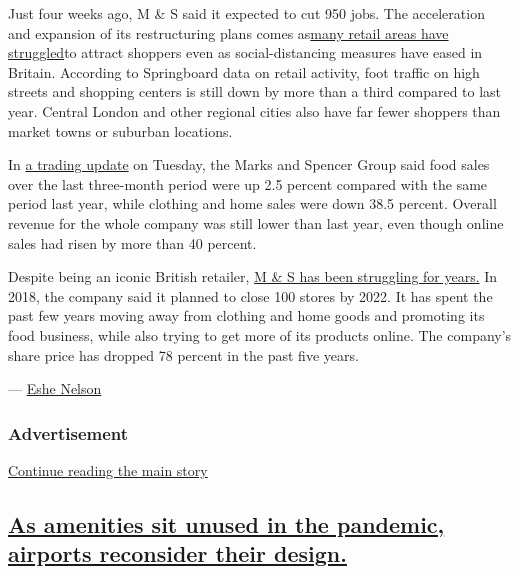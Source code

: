 Just four weeks ago, M \& S said it expected to cut 950 jobs. The
acceleration and expansion of its restructuring plans comes
as\href{https://www.nytimes3xbfgragh.onion/2020/07/31/business/britain-economic-comeback-suburbs.html}{many
retail areas have struggled}to attract shoppers even as
social-distancing measures have eased in Britain. According to
Springboard data on retail activity, foot traffic on high streets and
shopping centers is still down by more than a third compared to last
year. Central London and other regional cities also have far fewer
shoppers than market towns or suburban locations.

In
\href{https://corporate.marksandspencer.com/media/press-releases/5e0f046f7880b21924350282/marks-and-spencer-group-plc-trading-update-and-streamlining-announcement}{a
trading update} on Tuesday, the Marks and Spencer Group said food sales
over the last three-month period were up 2.5 percent compared with the
same period last year, while clothing and home sales were down 38.5
percent. Overall revenue for the whole company was still lower than last
year, even though online sales had risen by more than 40 percent.

Despite being an iconic British retailer,
\href{https://www.nytimes3xbfgragh.onion/2018/10/02/business/marks-spencer-faded-glory.html}{M
\& S has been struggling for years.} In 2018, the company said it
planned to close 100 stores by 2022. It has spent the past few years
moving away from clothing and home goods and promoting its food
business, while also trying to get more of its products online. The
company's share price has dropped 78 percent in the past five years.

--- \href{https://www.nytimes3xbfgragh.onion/by/eshe-nelson}{Eshe
Nelson}

\hypertarget{advertisement-2}{%
\subsubsection{Advertisement}\label{advertisement-2}}

\protect\hyperlink{after-dfp-ad-mid3}{Continue reading the main story}

\hypertarget{as-amenities-sit-unused-in-the-pandemic-airports-reconsider-their-design}{%
\subsection{\texorpdfstring{\protect\hyperlink{as-amenities-sit-unused-in-the-pandemic-airports-reconsider-their-design}{As
amenities sit unused in the pandemic, airports reconsider their
design.}}{As amenities sit unused in the pandemic, airports reconsider their design.}}\label{as-amenities-sit-unused-in-the-pandemic-airports-reconsider-their-design}}

